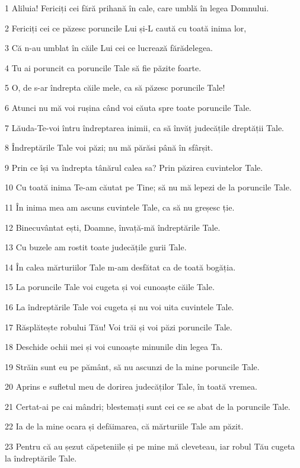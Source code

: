 \par 1 Aliluia! Fericiți cei fără prihană în cale, care umblă în legea Domnului.
\par 2 Fericiți cei ce păzesc poruncile Lui și-L caută cu toată inima lor,
\par 3 Că n-au umblat în căile Lui cei ce lucrează fărădelegea.
\par 4 Tu ai poruncit ca poruncile Tale să fie păzite foarte.
\par 5 O, de s-ar îndrepta căile mele, ca să păzesc poruncile Tale!
\par 6 Atunci nu mă voi rușina când voi căuta spre toate poruncile Tale.
\par 7 Lăuda-Te-voi întru îndreptarea inimii, ca să învăț judecățile dreptății Tale.
\par 8 Îndreptările Tale voi păzi; nu mă părăsi până în sfârșit.
\par 9 Prin ce își va îndrepta tânărul calea sa? Prin păzirea cuvintelor Tale.
\par 10 Cu toată inima Te-am căutat pe Tine; să nu mă lepezi de la poruncile Tale.
\par 11 În inima mea am ascuns cuvintele Tale, ca să nu greșesc ție.
\par 12 Binecuvântat ești, Doamne, învață-mă îndreptările Tale.
\par 13 Cu buzele am rostit toate judecățile gurii Tale.
\par 14 În calea mărturiilor Tale m-am desfătat ca de toată bogăția.
\par 15 La poruncile Tale voi cugeta și voi cunoaște căile Tale.
\par 16 La îndreptările Tale voi cugeta și nu voi uita cuvintele Tale.
\par 17 Răsplătește robului Tău! Voi trăi și voi păzi poruncile Tale.
\par 18 Deschide ochii mei și voi cunoaște minunile din legea Ta.
\par 19 Străin sunt eu pe pământ, să nu ascunzi de la mine poruncile Tale.
\par 20 Aprins e sufletul meu de dorirea judecăților Tale, în toată vremea.
\par 21 Certat-ai pe cai mândri; blestemați sunt cei ce se abat de la poruncile Tale.
\par 22 Ia de la mine ocara și defăimarea, că mărturiile Tale am păzit.
\par 23 Pentru că au șezut căpeteniile și pe mine mă cleveteau, iar robul Tău cugeta la îndreptările Tale.
